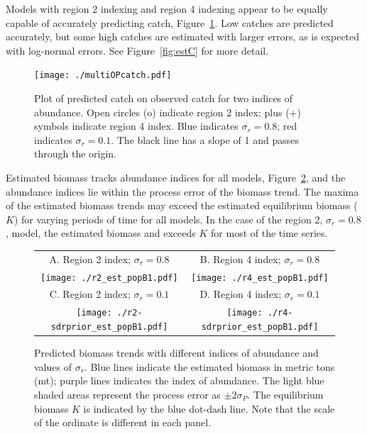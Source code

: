 \documentclass[12pt,letterpaper]{article}
\begin{document}
Models with region 2 indexing and region 4 indexing appear to be
equally capable of accurately predicting catch,
Figure~\ref{fig:mopcatch}. Low catches are predicted
accurately, but some high catches are estimated with larger errors, as is
expected with log-normal errors. 
See Figure~\ref{fig:estC} for more detail.
\pagebreak[4]

\begin{figure}
\begin{center}
\texttt{[image: ./multiOPcatch.pdf]}
\caption{Plot of predicted catch on observed catch for two indices of
abundance.
Open circles (o) indicate region 2 index; plus (+) symbols indicate
region 4 index.
Blue indicates $\sigma_r=0.8$; red indicates $\sigma_r=0.1$.
The black line has a slope of 1 and passes through the origin.
\label{fig:mopcatch}
}
\end{center}
\end{figure}

Estimated biomass tracks abundance indices for all models,
Figure~\ref{fig:estbiomass}, and the abundance indices lie within the
process error of the biomass trend.
The maxima of the estimated biomass trends may exceed the
estimated equilibrium biomass ($K$) for varying periods of time for
all models.
In the case of the region 2, $\sigma_r=0.8$, model,
the estimated biomass and exceeds $K$
for most of the time series.


\begin{figure}
\begin{center}
{\scriptsize \sffamily
\begin{tabular}{cc}
A. Region 2 index; $\sigma_r=0.8$ &
B. Region 4 index; $\sigma_r=0.8$ \\
\texttt{[image: ./r2\_est\_popB1.pdf]} &
\texttt{[image: ./r4\_est\_popB1.pdf]} \\
C. Region 2 index; $\sigma_r=0.1$ &
D. Region 4 index; $\sigma_r=0.1$ \\
\texttt{[image: ./r2-sdrprior\_est\_popB1.pdf]} &
\texttt{[image: ./r4-sdrprior\_est\_popB1.pdf]} \\
\end{tabular}
}
\caption{Predicted biomass trends with different indices of abundance
and values of $\sigma_r$.
Blue lines indicate the estimated biomass in metric tons (mt);
purple lines indicates the index of abundance.
The light blue shaded areas represent the process error as 
$\pm 2\sigma_P$.
The equilibrium biomass $K$ is indicated by the blue dot-dash line.
Note that the scale of the ordinate is different in each panel.
\label{fig:estbiomass}}
\end{center}
\end{figure}
\end{document}
